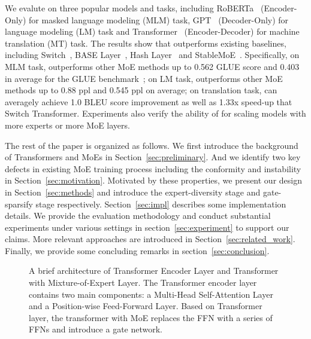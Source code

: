 We evalute \evomoe{} on three popular models and tasks, including RoBERTa~\cite{liu2019roberta} (Encoder-Only) for masked language modeling (MLM) task, GPT~\cite{gpt2} (Decoder-Only) for language modeling (LM) task and Transformer~\cite{DBLP:conf/nips/VaswaniSPUJGKP17} (Encoder-Decoder) for machine translation (MT) task. 
The results show that \evomoe{} outperforms existing baselines, including Switch~\cite{DBLP:switch}, BASE Layer~\cite{DBLP:conf/icml/baselayer}, Hash Layer~\cite{roller2021hash} and StableMoE~\cite{DBLP:conf/acl/stablemoe}. Specifically, on MLM task, \ourmethods{} outperforms other MoE methods up to 0.562 GLUE score and 0.403 in average for the GLUE benchmark~\cite{DBLP:conf/emnlp/glue}; 
on LM task,  \ourmethods{} outperforms other MoE methods up to 0.88 ppl and 0.545 ppl on average;
on translation task, \evomoe{} can averagely achieve 1.0 BLEU score improvement as well as 1.33x speed-up that Switch Transformer.
Experiments also verify the ability of \evomoe for scaling models with more experts or more MoE layers.

The rest of the paper is organized as follows. We first introduce the background of Transformers and MoEs in Section~\ref{sec:preliminary}. And we identify two key defects in existing MoE training process including the conformity and instability in Section~\ref{sec:motivation}. Motivated by these properties, we present our \evomoe design in Section~\ref{sec:methods} and introduce the expert-diversity stage and gate-sparsify stage respectively. Section~\ref{sec:impl} describes some implementation details.
We provide the evaluation methodology and conduct substantial experiments under various settings in section~\ref{sec:experiment} to support our claims. More relevant approaches are introduced in Section~\ref{sec:related_work}. Finally, we provide some concluding remarks in section~\ref{sec:conclusion}.

\begin{figure}[t]
    \centering
    \caption{A brief architecture of Transformer Encoder Layer and Transformer with Mixture-of-Expert Layer. The Transformer encoder layer contains two main components: a Multi-Head Self-Attention Layer and a Position-wise Feed-Forward Layer. Based on Transformer layer, the transformer with MoE replaces the FFN with a series of FFNs and introduce a gate network.}
    \label{fig:preliminary}
\end{figure}

